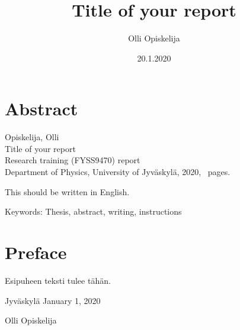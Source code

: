 \documentclass[final]{thesis} %
\title{Title of your report}
\author{Olli Opiskelija}
\date{20.1.2020}
\begin{document}
\titleJYFL


\section*{Abstract}

\begin{singlespace}
	Opiskelija, Olli\\
	Title of your report \\
	Research training (FYSS9470) report \\
	Department of Physics, University of Jyväskylä, 2020, \pageref{LastPage}~pages.
\end{singlespace}

\bigskip

\noindent This should be written in English. \lipsum[1]

\bigskip 

\noindent Keywords: Thesis, abstract, writing, instructions

\section*{Preface}

Esipuheen teksti tulee tähän. \lipsum[1]

\bigskip

\noindent Jyväskylä January 1, 2020

\bigskip

\noindent Olli Opiskelija

\tableofcontents

\end{document}
